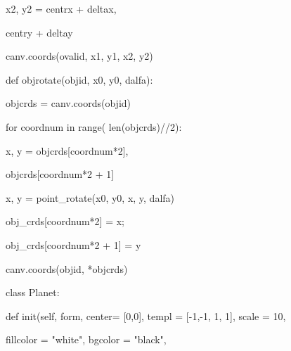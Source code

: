 \documentclass[14pt, oneside]{SavkinSeliverstov}
\begin{document}
x2, y2 = centr\underline{\hspace{0.2cm}}x + delta\underline{\hspace{0.2cm}}x, 

centr\underline{\hspace{0.2cm}}y + delta\underline{\hspace{0.2cm}}y
	
	canv.coords(oval\underline{\hspace{0.2cm}}id, x1, y1, x2, y2)


def obj\underline{\hspace{0.2cm}}rotate(obj\underline{\hspace{0.2cm}}id, x0, y0, dalfa):

	obj\underline{\hspace{0.2cm}}crds = canv.coords(obj\underline{\hspace{0.2cm}}id)
	
	for coord\underline{\hspace{0.2cm}}num in range( len(obj\underline{\hspace{0.2cm}}crds)//2):
	
		x, y = obj\underline{\hspace{0.2cm}}crds[coord\underline{\hspace{0.2cm}}num*2],
		
		obj\underline{\hspace{0.2cm}}crds[coord\underline{\hspace{0.2cm}}num*2 + 1]
		
		x, y = point_rotate(x0, y0, x, y, dalfa)
		
		obj_crds[coord\underline{\hspace{0.2cm}}num*2] = x; 
		
		obj_crds[coord\underline{\hspace{0.2cm}}num*2 + 1] = y
		
	canv.coords(obj\underline{\hspace{0.2cm}}id, *obj\underline{\hspace{0.2cm}}crds)     
	

class Planet:

	def \underline{\hspace{0.2cm}}init\underline{\hspace{0.2cm}}(self, form, center= [0,0], templ = [-1,-1, 1, 1], scale = 10,
	
		     fill\underline{\hspace{0.2cm}}color = "white", bg\underline{\hspace{0.2cm}}color = "black",
		     
\end{document}
